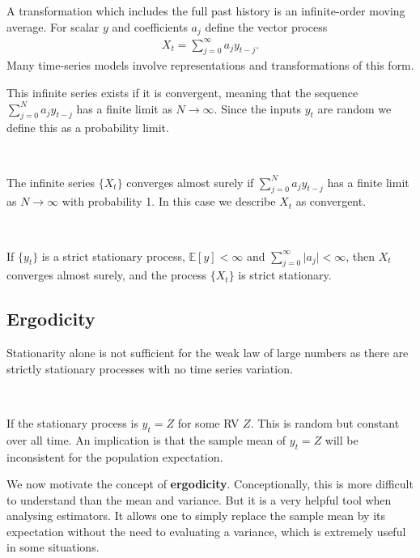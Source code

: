 A transformation which includes the full past history is an infinite-order moving average.
For scalar $y$ and coefficients $a_j$ define the vector process
\begin{gather*}
    X_t = \sum_{j=0}^{\infty} a_j y_{t-j}.
\end{gather*}
Many time-series models involve representations and transformations of this form.

This infinite series exists if it is convergent, meaning that the sequence $\sum_{j=0}^{N}a_j y_{t-j}$
has a finite limit as $N \to \infty$.  Since the inputs $y_t$ are random we define this as a probability limit.

\begin{definition}[Convergence]\label{def:convergence}
    \

    The infinite series $\{X_t\}$ converges almost surely if $\sum_{j=0}^{N} a_j y_{t-j}$
    has a finite limit as $N \to \infty$ with probability 1.
    In this case we describe $X_t$ as convergent.
    
\end{definition}
\begin{theorem}\label{thm:convergence-stationary}
    \

    If $\{y_t\}$ is a strict stationary process, $\mathbb{E}[y] < \infty$ 
    and $\sum_{j=0}^{\infty} \vert a_j \vert < \infty$,
    then $X_t$ converges almost surely,
    and the process $\{X_t\}$ is strict stationary.  
\end{theorem}

\subsection{Ergodicity}
\label{sec:ergodicity}

Stationarity alone is not sufficient for the weak law of large numbers as there are strictly stationary
processes with no time series variation.

\begin{eg}
    \
    
    If the stationary process is $y_t = Z$ for some RV $Z$.
    This is random but constant over all time. 
    An implication is that the sample mean of $y_t = Z$ will be inconsistent for the population expectation.
\end{eg}

We now motivate the concept of \textbf{ergodicity}\footnotemark. Conceptionally, this is more difficult to understand
than the mean and variance. But it is a very helpful tool when analysing estimators. It allows one
to simply replace the sample mean by its expectation without the need to evaluating a variance,
which is extremely useful in some situations.

